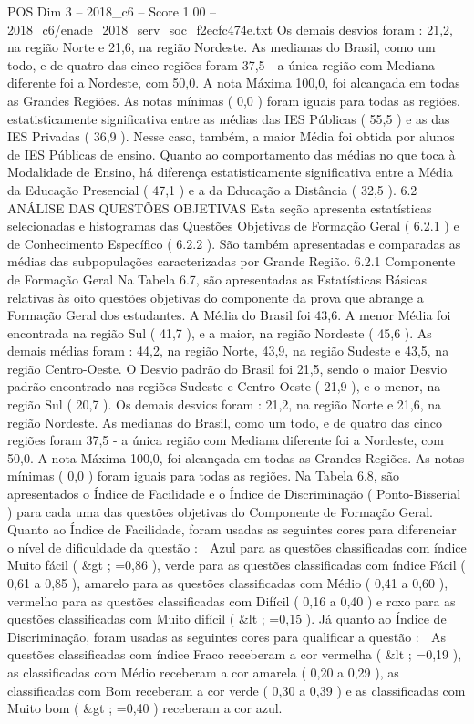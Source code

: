 \begin{textsample}{POS Dim 3 – 2018\_c6 – Score 1.00 – 2018\_c6/enade\_2018\_serv\_soc\_f2ecfc474e.txt}
Os demais desvios foram : 21,2, na região Norte e 21,6, na região Nordeste.
As medianas do Brasil, como um todo, e de quatro das cinco regiões foram 37,5 - a única região com Mediana diferente foi a Nordeste, com 50,0.
A nota Máxima 100,0, foi alcançada em todas as Grandes Regiões.
As notas mínimas ( 0,0 ) foram iguais para todas as regiões. estatisticamente significativa entre as médias das IES Públicas ( 55,5 ) e as das IES Privadas ( 36,9 ).
Nesse caso, também, a maior Média foi obtida por alunos de IES Públicas de ensino.
Quanto ao comportamento das médias no que toca à Modalidade de Ensino, há diferença estatisticamente significativa entre a Média da Educação Presencial ( 47,1 ) e a da Educação a Distância ( 32,5 ). 6.2 ANÁLISE DAS QUESTÕES OBJETIVAS Esta seção apresenta estatísticas selecionadas e histogramas das Questões Objetivas de Formação Geral ( 6.2.1 ) e de Conhecimento Específico ( 6.2.2 ).
São também apresentadas e comparadas as médias das subpopulações caracterizadas por Grande Região. 6.2.1 Componente de Formação Geral Na Tabela 6.7, são apresentadas as Estatísticas Básicas relativas às oito questões objetivas do componente da prova que abrange a Formação Geral dos estudantes.
A Média do Brasil foi 43,6.
A menor Média foi encontrada na região Sul ( 41,7 ), e a maior, na região Nordeste ( 45,6 ).
As demais médias foram : 44,2, na região Norte, 43,9, na região Sudeste e 43,5, na região Centro-Oeste.
O Desvio padrão do Brasil foi 21,5, sendo o maior Desvio padrão encontrado nas regiões Sudeste e Centro-Oeste ( 21,9 ), e o menor, na região Sul ( 20,7 ).
Os demais desvios foram : 21,2, na região Norte e 21,6, na região Nordeste.
As medianas do Brasil, como um todo, e de quatro das cinco regiões foram 37,5 - a única região com Mediana diferente foi a Nordeste, com 50,0.
A nota Máxima 100,0, foi alcançada em todas as Grandes Regiões.
As notas mínimas ( 0,0 ) foram iguais para todas as regiões.
Na Tabela 6.8, são apresentados o Índice de Facilidade e o Índice de Discriminação ( Ponto-Bisserial ) para cada uma das questões objetivas do Componente de Formação Geral.
Quanto ao Índice de Facilidade, foram usadas as seguintes cores para diferenciar o nível de dificuldade da questão :  Azul para as questões classificadas com índice Muito fácil ( \&gt ; =0,86 ), verde para as questões classificadas com índice Fácil ( 0,61 a 0,85 ), amarelo para as questões classificadas com Médio ( 0,41 a 0,60 ), vermelho para as questões classificadas com Difícil ( 0,16 a 0,40 ) e roxo para as questões classificadas com Muito difícil ( \&lt ; =0,15 ).
Já quanto ao Índice de Discriminação, foram usadas as seguintes cores para qualificar a questão :  As questões classificadas com índice Fraco receberam a cor vermelha ( \&lt ; =0,19 ), as classificadas com Médio receberam a cor amarela ( 0,20 a 0,29 ), as classificadas com Bom receberam a cor verde ( 0,30 a 0,39 ) e as classificadas com Muito bom ( \&gt ; =0,40 ) receberam a cor azul.

\end{textsample}
